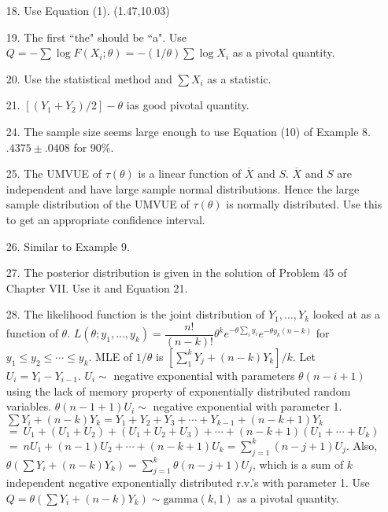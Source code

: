 \begin{enumerate}
	\item[18.] Use Equation (1). (1.47,10.03)
	
	\item[19.] The first ``the" should be ``a". Use $Q = -\sum\log F(X_i;\theta) = -(1/\theta)\sum \log X_i$ as a pivotal quantity.
	
	\item[20.] Use the statistical method and $\sum X_i$ as a statistic.
	
	\item[21.] $[(Y_1+Y_2)/2] - \theta$ ias good pivotal quantity.
	
	\item[24.] The sample size seems large enough to use Equation (10) of Example 8. \\
	$.4375 \pm .0408$ for 90\%. 
	
	\item[25.] The UMVUE of $\tau(\theta)$ is a linear function of $\overline{X}$ and $S$.  $\overline{X}$ and $S$ are independent and have large sample normal distributions. Hence the large sample distribution of the UMVUE of $\tau(\theta)$ is normally distributed. Use this to get an appropriate confidence interval.
	
	\newpage
	\item[26.] Similar to Example 9.
	
	\item[27.] The posterior distribution is given in the solution of Problem 45 of Chapter VII. Use it and Equation 21.
	
	\item[28.] The likelihood function is the joint distribution of $Y_1, \ldots, Y_k$ looked at as a function of $\theta$. $L(\theta;y_1,\ldots,y_k) = \dfrac{n!}{(n-k)!}\theta^ke^{-\theta\sum\limits_i y_i}e^{-\theta y_k(n-k)}$ for $y_1\le y_2\le \cdots\le y_k$. MLE of $1/\theta$ is $[\sum\limits_1^k Y_j + (n-k)Y_k]/k$. Let $U_i = Y_i-Y_{i-1}$. $U_i\sim$ negative exponential with parameters $\theta(n-i+1)$ using the lack of memory property of exponentially distributed random variables. $\theta(n-1+1)U_i\sim$ negative exponential with parameter 1. \\
	$\sum Y_i+ (n-k)Y_k = Y_1 + Y_2 + Y_3 + \cdots + Y_{k-1} + (n-k+1)Y_k$ \\
	$=\ U_1 + (U_1+U_2) + (U_1+U_2+U_3) + \cdots + (n-k+1)(U_1+\cdots+U_k)$ \\
	$=\ nU_1 + (n-1)U_2 + \cdots + (n-k+1)U_k = \sum\limits_{j=1}^k (n-j+1)U_j$. Also, \\
	$\theta(\sum Y_i + (n-k)Y_k) = \sum\limits_{j=1}^k \theta(n-j+1)U_j$, which is a sum of $k$ independent negative exponentially distributed r.v.'s with parameter 1. Use $Q=\theta(\sum Y_i + (n-k)Y_k) \sim \mbox{gamma}(k,1)$ as a pivotal quantity.  
	
\end{enumerate}